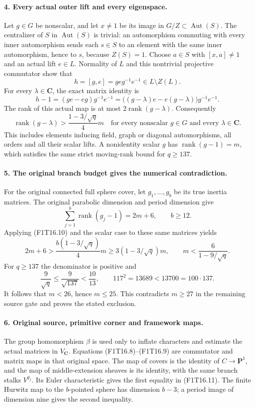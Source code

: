 \paragraph{4. Every actual outer lift and every eigenspace.}
Let \(g\in G\) be nonscalar, and let \(x\ne1\) be
its image in \(G/Z\subset\operatorname{Aut}(S)\).
The centralizer of \(S\) in \(\operatorname{Aut}(S)\)
is trivial: an automorphism commuting with every inner
automorphism sends each \(s\in S\) to an element with
the same inner automorphism, hence to \(s\), because
\(Z(S)=1\). Choose \(a\in S\) with \([x,a]\ne1\)
and an actual lift \(e\in L\). Normality of \(L\)
and this nontrivial projective commutator show that
\[
               h=[g,e]=geg^{-1}e^{-1}
                       \in L\setminus Z(L).
 \tag{F1T16.8}
\]
For every \(\lambda\in\mathbf C\), the exact matrix
identity is
\[
 h-1=(ge-eg)g^{-1}e^{-1}
     =\bigl((g-\lambda)e-e(g-\lambda)\bigr)g^{-1}e^{-1}.
 \tag{F1T16.9}
\]
The rank of this actual map is at most
\(2\operatorname{rank}(g-\lambda)\). Consequently
\[
 \operatorname{rank}(g-\lambda)
       >\frac{1-3/\sqrt q}{4}m
 \quad\text{for every nonscalar }g\in G
       \text{ and every }\lambda\in\mathbf C.
 \tag{F1T16.10}
\]
This includes elements inducing field, graph or diagonal
automorphisms, all orders and all their scalar lifts.
A nonidentity scalar \(g\) has
\(\operatorname{rank}(g-1)=m\), which satisfies the same
strict moving-rank bound for \(q\ge137\).

\paragraph{5. The original branch budget gives the numerical contradiction.}
For the original connected full sphere cover, let
\(g_1,\ldots,g_b\) be its true inertia matrices. The
original parabolic dimension and period dimension give
\[
 \sum_{j=1}^b\operatorname{rank}(g_j-1)=2m+6,
                         \qquad b\ge12.
 \tag{F1T16.11}
\]
Applying (F1T16.10) and the scalar case to these same
matrices yields
\[
 2m+6>
 \frac{b(1-3/\sqrt q)}4m
 \ge3(1-3/\sqrt q)m,
 \qquad
 m<\frac6{1-9/\sqrt q}.
 \tag{F1T16.12}
\]
For \(q\ge137\) the denominator is positive and
\[
 \frac9{\sqrt q}\le\frac9{\sqrt{137}}<\frac{10}{13},
 \qquad
 117^2=13689<13700=100\cdot137.
 \tag{F1T16.13}
\]
It follows that \(m<26\), hence \(m\le25\). This
contradicts \(m\ge27\) in the remaining source gate
and proves the stated exclusion.

\paragraph{6. Original source, primitive corner and framework maps.}
The group homomorphism \(\beta\) is used only to inflate
characters and estimate the actual matrices in
\(V_{\mathbf C}\). Equations (F1T16.8)--(F1T16.9)
are commutator and matrix maps in that original space.
The map of covers is the identity of
\(C\to\mathbf P^1\), and the map of middle-extension
sheaves is its identity, with the same branch stalks
\(V^{g_j}\). Its Euler characteristic gives the first
equality in (F1T16.11). The finite Hurwitz map to the
\(b\)-pointed sphere has dimension \(b-3\); a period
image of dimension nine gives the second inequality.

